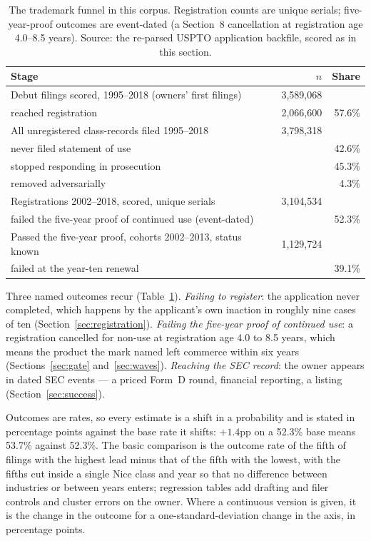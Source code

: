 \begin{table}[h]\centering\small
\caption{The trademark funnel in this corpus. Registration counts are
unique serials; five-year-proof outcomes are event-dated (a Section~8
cancellation at registration age 4.0--8.5 years). Source: the re-parsed
USPTO application backfile, scored as in this section.}
\label{tab:funnel}
\begin{tabular}{lrr}
\toprule
Stage & $n$ & Share \\
\midrule
Debut filings scored, 1995--2018 (owners' first filings) & 3{,}589{,}068 & \\
\quad reached registration & 2{,}066{,}600 & 57.6\% \\
\midrule
All unregistered class-records filed 1995--2018 & 3{,}798{,}318 & \\
\quad never filed statement of use & & 42.6\% \\
\quad stopped responding in prosecution & & 45.3\% \\
\quad removed adversarially & & 4.3\% \\
\midrule
Registrations 2002--2018, scored, unique serials & 3{,}104{,}534 & \\
\quad failed the five-year proof of continued use (event-dated) & & 52.3\% \\
\midrule
Passed the five-year proof, cohorts 2002--2013, status known & 1{,}129{,}724 & \\
\quad failed at the year-ten renewal & & 39.1\% \\
\bottomrule
\end{tabular}
\end{table}

Three named outcomes recur (Table~\ref{tab:funnel}). \emph{Failing to
register}: the application never completed, which happens by the
applicant's own inaction in roughly nine cases of ten
(Section~\ref{sec:registration}). \emph{Failing the five-year proof of
continued use}: a registration cancelled for non-use at registration age
4.0 to 8.5 years, which means the product the mark named left commerce
within six years (Sections~\ref{sec:gate} and~\ref{sec:waves}).
\emph{Reaching the SEC record}: the owner appears in dated SEC events ---
a priced Form~D round, financial reporting, a listing
(Section~\ref{sec:success}).

Outcomes are rates, so every estimate is a shift in a probability and is
stated in percentage points against the base rate it shifts: $+1.4$pp on
a 52.3\% base means 53.7\% against 52.3\%. The basic comparison is the
outcome rate of the fifth of filings with the highest lead minus that of
the fifth with the lowest, with the fifths cut inside a single Nice class
and year so that no difference between industries or between years
enters; regression tables add drafting and filer controls and cluster
errors on the owner. Where a continuous version is given, it is the
change in the outcome for a one-standard-deviation change in the axis, in
percentage points.

